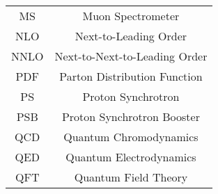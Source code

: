 \begin{tabular}{|c|c|}
MS          & Muon Spectrometer                                                   \\
NLO         & Next-to-Leading Order                                               \\
NNLO        & Next-to-Next-to-Leading Order                                       \\
PDF         & Parton Distribution Function                                        \\
PS          & Proton Synchrotron                                                  \\
PSB         & Proton Synchrotron Booster                                          \\
QCD         & Quantum Chromodynamics                                              \\
QED         & Quantum Electrodynamics                                             \\
QFT         & Quantum Field Theory                                                \\
\bottomrule
\end{tabular}


